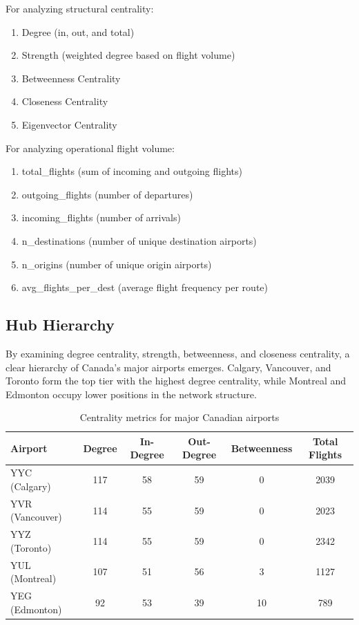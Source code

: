 \documentclass[9pt]{article}
\begin{document}
For analyzing structural centrality:
\begin{enumerate}[label=\arabic*.]
    \item Degree (in, out, and total)
    \item Strength (weighted degree based on flight volume)
    \item Betweenness Centrality
    \item Closeness Centrality
    \item Eigenvector Centrality
\end{enumerate}

For analyzing operational flight volume:
\begin{enumerate}[label=\arabic*.]
    \item total\_flights (sum of incoming and outgoing flights)
    \item outgoing\_flights (number of departures)
    \item incoming\_flights (number of arrivals)
    \item n\_destinations (number of unique destination airports)
    \item n\_origins (number of unique origin airports)
    \item avg\_flights\_per\_dest (average flight frequency per route)
\end{enumerate}

\subsection{Hub Hierarchy}

By examining degree centrality, strength, betweenness, and closeness centrality, a clear hierarchy of Canada's major airports emerges. Calgary, Vancouver, and Toronto form the top tier with the highest degree centrality, while Montreal and Edmonton occupy lower positions in the network structure.

\begin{table}[h!]
    \centering
    \caption{Centrality metrics for major Canadian airports}
    \begin{tabular}{lccccc}
        \toprule
        Airport & Degree & In-Degree & Out-Degree & Betweenness & Total Flights \\
        \midrule
        YYC (Calgary)   & 117 & 58 & 59 & 0  & 2039 \\
        YVR (Vancouver) & 114 & 55 & 59 & 0  & 2023 \\
        YYZ (Toronto)   & 114 & 55 & 59 & 0  & 2342 \\
        YUL (Montreal)  & 107 & 51 & 56 & 3  & 1127 \\
        YEG (Edmonton)  & 92  & 53 & 39 & 10 & 789  \\
        \bottomrule
    \end{tabular}
\end{table}
\end{document}
